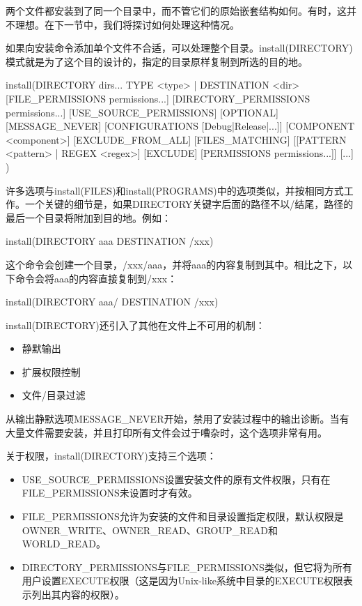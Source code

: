 两个文件都安装到了同一个目录中，而不管它们的原始嵌套结构如何。有时，这并不理想。在下一节中，我们将探讨如何处理这种情况。


如果向安装命令添加单个文件不合适，可以处理整个目录。install(DIRECTORY)模式就是为了这个目的设计的，指定的目录原样复制到所选的目的地。

\begin{shell}
install(DIRECTORY dirs...
        TYPE <type> | DESTINATION <dir>
        [FILE_PERMISSIONS permissions...]
        [DIRECTORY_PERMISSIONS permissions...]
        [USE_SOURCE_PERMISSIONS] [OPTIONAL] [MESSAGE_NEVER]
        [CONFIGURATIONS [Debug|Release|...]]
        [COMPONENT <component>] [EXCLUDE_FROM_ALL]
        [FILES_MATCHING]
        [[PATTERN <pattern> | REGEX <regex>] [EXCLUDE]
        [PERMISSIONS permissions...]] [...]
)
\end{shell}

许多选项与install(FILES)和install(PROGRAMS)中的选项类似，并按相同方式工作。一个关键的细节是，如果DIRECTORY关键字后面的路径不以/结尾，路径的最后一个目录将附加到目的地。例如：

\begin{cmake}
install(DIRECTORY aaa DESTINATION /xxx)
\end{cmake}

这个命令会创建一个目录，/xxx/aaa，并将aaa的内容复制到其中。相比之下，以下命令会将aaa的内容直接复制到/xxx：

\begin{cmake}
install(DIRECTORY aaa/ DESTINATION /xxx)
\end{cmake}

install(DIRECTORY)还引入了其他在文件上不可用的机制：

\begin{itemize}
\item
静默输出

\item
扩展权限控制

\item
文件/目录过滤
\end{itemize}

从输出静默选项MESSAGE\_NEVER开始，禁用了安装过程中的输出诊断。当有大量文件需要安装，并且打印所有文件会过于嘈杂时，这个选项非常有用。

关于权限，install(DIRECTORY)支持三个选项：

\begin{itemize}
\item
USE\_SOURCE\_PERMISSIONS设置安装文件的原有文件权限，只有在FILE\_PERMISSIONS未设置时才有效。

\item
FILE\_PERMISSIONS允许为安装的文件和目录设置指定权限，默认权限是OWNER\_WRITE、OWNER\_READ、GROUP\_READ和WORLD\_READ。

\item
DIRECTORY\_PERMISSIONS与FILE\_PERMISSIONS类似，但它将为所有用户设置EXECUTE权限（这是因为Unix-like系统中目录的EXECUTE权限表示列出其内容的权限）。
\end{itemize}

